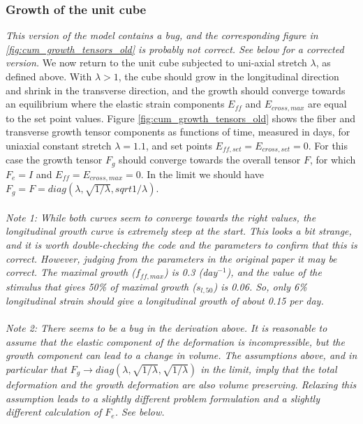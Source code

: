 \documentclass[a4paper,10pt]{article}
\begin{document}
\subsubsection{Growth of the unit cube}
\emph{This version of the model contains a bug, and the corresponding figure in \ref{fig:cum_growth_tensors_old} is probably 
not correct. See below for a corrected version.}
We now return to the unit cube subjected to uni-axial stretch $\lambda$, as defined above. With $\lambda > 1$, the cube 
should grow in the longitudinal direction and shrink in the transverse direction, and the growth should converge towards
an equilibrium where the elastic strain components $E_{ff}$ and $E_{cross,max}$ are equal to the set point values.
Figure \ref{fig:cum_growth_tensors_old} shows the fiber and transverse growth tensor components as functions of time, 
measured in days, for uniaxial constant stretch $\lambda = 1.1$, and set points $E_{ff, set} = E_{cross,set} = 0$. 
For this case the growth tensor $F_g$ should converge towards the overall tensor $F$, for which $F_e = I$ and 
$E_{ff} = E_{cross,max} = 0$.  In the limit we should have $F_g = F = diag(\lambda, \sqrt{1/\lambda}, sqrt{1/\lambda})$. 
\ \\ \ \\
\emph{Note 1: While both curves seem to converge towards the right values, the longitudinal growth curve is extremely steep at 
the start. This looks a bit strange, and it is worth double-checking the code and the parameters to confirm that this is correct.
However, judging from the parameters in the original paper it may be correct. The maximal growth ($f_{ff,max}$) is 0.3 (day$^{-1}$), 
and the value of the stimulus that gives 50\% of maximal growth ($s_{l,50}$) is 0.06. So, only 6\% longitudinal strain should give a 
longitudinal growth of about 0.15 per day.}
\ \\ \ \\
\emph{Note 2: There seems to be a bug in the derivation above. It is reasonable to assume that the elastic component
of the deformation is incompressible, but the growth component can lead to a change in volume. The assumptions above, 
and in particular that $F_g \rightarrow diag(\lambda, \sqrt{1/\lambda}, \sqrt{1/\lambda})$ in the limit, 
imply that the total deformation and the growth deformation are also volume preserving. Relaxing this assumption leads
to a slightly different problem formulation and a slightly different calculation of $F_e$. See below.}
\end{document}

